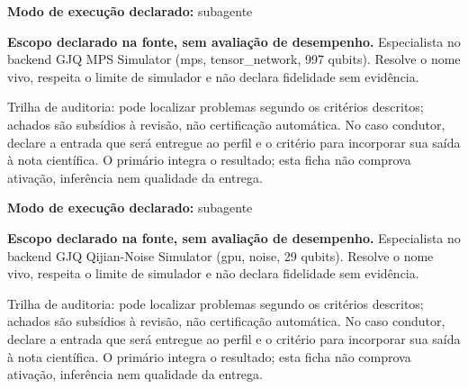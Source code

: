 \begin{arquitetura}
\textbf{Modo de execução declarado:} subagente
\end{arquitetura}


\begin{descricao}
\textbf{Escopo declarado na fonte, sem avaliação de desempenho.}
Especialista no backend GJQ MPS Simulator (mps, tensor\_network, 997 qubits). Resolve o nome vivo, respeita o limite de simulador e não declara fidelidade sem evidência.
\end{descricao}

\begin{funcao}
Trilha de auditoria: pode localizar problemas segundo os critérios descritos; achados são subsídios à revisão, não certificação automática. No caso condutor, declare a entrada que será entregue ao perfil e o critério para incorporar sua saída à nota científica. O primário integra o resultado; esta ficha não comprova ativação, inferência nem qualidade da entrega.
\end{funcao}

\begin{arquitetura}
\textbf{Modo de execução declarado:} subagente
\end{arquitetura}


\begin{descricao}
\textbf{Escopo declarado na fonte, sem avaliação de desempenho.}
Especialista no backend GJQ Qijian-Noise Simulator (gpu, noise, 29 qubits). Resolve o nome vivo, respeita o limite de simulador e não declara fidelidade sem evidência.
\end{descricao}

\begin{funcao}
Trilha de auditoria: pode localizar problemas segundo os critérios descritos; achados são subsídios à revisão, não certificação automática. No caso condutor, declare a entrada que será entregue ao perfil e o critério para incorporar sua saída à nota científica. O primário integra o resultado; esta ficha não comprova ativação, inferência nem qualidade da entrega.
\end{funcao}

